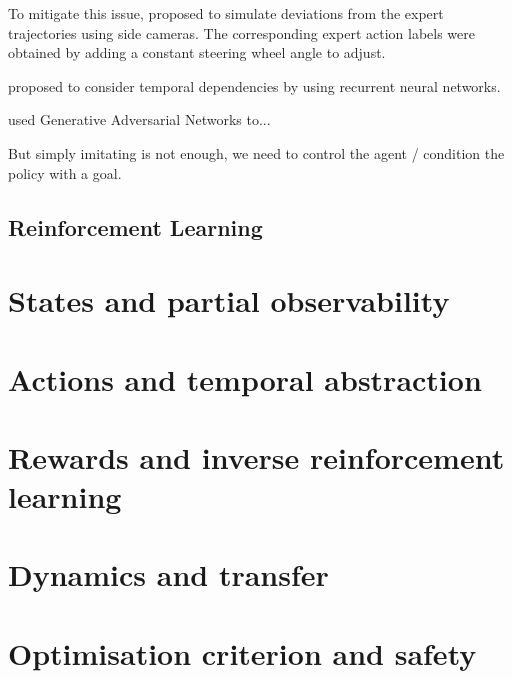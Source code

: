 To mitigate this issue, \citep{Bojarski2016} proposed to simulate deviations from the expert trajectories using side cameras. The corresponding expert action labels were obtained by adding a constant steering wheel angle to adjust.

\citep{Eraqi2017,Xu2017} proposed to consider temporal dependencies by using recurrent neural networks.

\citep{Kuefler2017,Bhattacharyya2018} used Generative Adversarial Networks to...

But simply imitating is not enough, we need to control the agent / condition the policy with a goal. \citep{Codevilla2018}

\subsection{Reinforcement Learning}
\section{States and partial observability}
\section{Actions and temporal abstraction}
\section{Rewards and inverse reinforcement learning}
\section{Dynamics and transfer}
\section{Optimisation criterion and safety}
